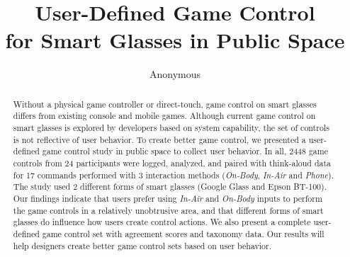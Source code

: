\documentclass{sigchi}
\begin{document}
\title{User-Defined Game Control \\for Smart Glasses in Public Space}

\author{\alignauthor Anonymous
 \\ 
}


\maketitle




\begin{abstract}

Without a physical game controller or direct-touch, game control on smart glasses differs from existing console and mobile games. Although current game control on smart glasses is explored by developers based on system capability, the set of controls is not reflective of user behavior. 
To create better game control, we presented a user-defined game control study in public space to collect user behavior. In all, 2448 game controls from 24 participants were logged, analyzed, and paired with think-aloud data for 17 commands performed with 3 interaction methods (\emph{On-Body}, \emph{In-Air} and \emph{Phone}). The study used 2 different forms of smart glasses (Google Glass and Epson BT-100). Our findings indicate that users prefer using \emph{In-Air} and \emph{On-Body} inputs to perform the game controls in a relatively unobtrusive area, and that different forms of smart glasses do influence how users create control actions. We also present a complete user-defined game control set with agreement scores and taxonomy data. 
Our results will help designers create better game control sets based on user behavior.

\end{abstract}


\end{document}
